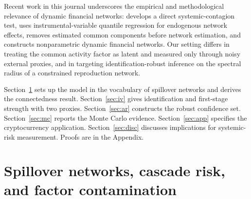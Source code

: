 \documentclass[12pt]{article}
\theoremstyle{plain}\newtheorem{theorem}{Theorem}[section]\newtheorem{proposition}[theorem]{Proposition}\newtheorem{lemma}[theorem]{Lemma}\newtheorem{corollary}[theorem]{Corollary}
\theoremstyle{definition}\newtheorem{definition}[theorem]{Definition}\newtheorem{assumption}[theorem]{Assumption}\newtheorem{remark}[theorem]{Remark}
\begin{document}
Recent work in this journal underscores the empirical and methodological relevance of dynamic financial networks: \citet{leong2025} develops a direct systemic-contagion test, \citet{xu2024} uses instrumental-variable quantile regression for endogenous network effects, \citet{barigozzi2023fnets} removes estimated common components before network estimation, and \citet{cai2026} constructs nonparametric dynamic financial networks. Our setting differs in treating the common activity factor as latent and measured only through noisy external proxies, and in targeting identification-robust inference on the spectral radius of a constrained reproduction network.

Section~\ref{sec:model} sets up the model in the vocabulary of spillover networks and derives the connectedness result. Section~\ref{sec:iv} gives identification and first-stage strength with two proxies. Section~\ref{sec:ar} constructs the robust confidence set. Section~\ref{sec:mc} reports the Monte Carlo evidence. Section~\ref{sec:app} specifies the cryptocurrency application. Section~\ref{sec:disc} discusses implications for systemic-risk measurement. Proofs are in the Appendix.

\section{Spillover networks, cascade risk, and factor contamination}\label{sec:model}
\end{document}
